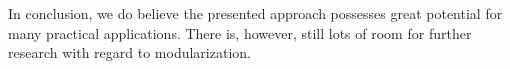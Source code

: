 \documentclass[conference]{IEEEtran}
\begin{document}
In conclusion, we do believe the presented approach possesses great potential for many practical applications. There is, however, still lots of room for further research with regard to modularization.


%






%


%
%
\end{document}
